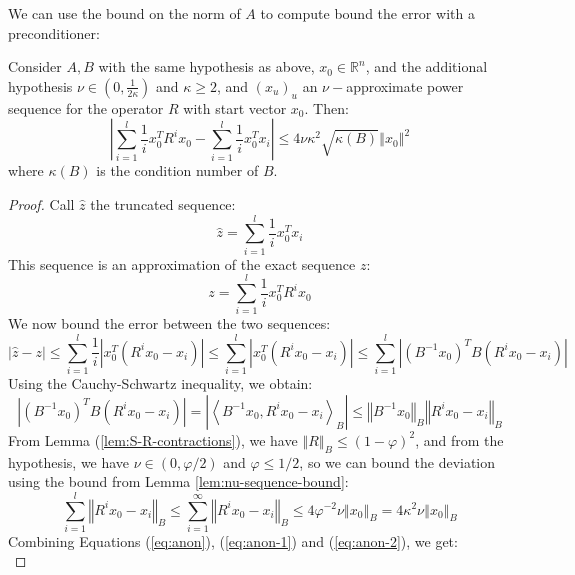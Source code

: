 We can use the bound on the norm of $A$ to compute bound the error
with a preconditioner: 
\begin{lemma}
\label{lem:partial-sequence-approximate}Consider $A,B$ with the
same hypothesis as above, $x_{0}\in\mathbb{R}^{n}$, and the additional
hypothesis $\nu\in\left(0,\frac{1}{2\kappa}\right)$ and $\kappa\ge2$,
and $\left(x_{u}\right)_{u}$ an $\nu-$approximate power sequence
for the operator $R$ with start vector $x_{0}$. Then: 
\[
\left|\sum_{i=1}^{l}\frac{1}{i}x_{0}^{T}R^{i}x_{0}-\sum_{i=1}^{l}\frac{1}{i}x_{0}^{T}x_{i}\right|\leq4\nu\kappa^{2}\sqrt{\kappa\left(B\right)}\left\Vert x_{0}\right\Vert ^{2}
\]
where $\kappa\left(B\right)$ is the condition number of $B$.\end{lemma}
\begin{proof}
Call $\hat{z}$ the truncated sequence: 
\[
\hat{z}=\sum_{i=1}^{l}\frac{1}{i}x_{0}^{T}x_{i}
\]
This sequence is an approximation of the exact sequence $z$: 
\[
z=\sum_{i=1}^{l}\frac{1}{i}x_{0}^{T}R^{i}x_{0}
\]
We now bound the error between the two sequences: 
\begin{equation}
\left|\hat{z}-z\right|\leq\sum_{i=1}^{l}\frac{1}{i}\left|x_{0}^{T}\left(R^{i}x_{0}-x_{i}\right)\right|\leq\sum_{i=1}^{l}\left|x_{0}^{T}\left(R^{i}x_{0}-x_{i}\right)\right|\leq\sum_{i=1}^{l}\left|\left(B^{-1}x_{0}\right)^{T}B\left(R^{i}x_{0}-x_{i}\right)\right|\label{eq:anon}
\end{equation}
Using the Cauchy-Schwartz inequality, we obtain: 
\begin{equation}
\left|\left(B^{-1}x_{0}\right)^{T}B\left(R^{i}x_{0}-x_{i}\right)\right|=\left|\left\langle B^{-1}x_{0},R^{i}x_{0}-x_{i}\right\rangle _{B}\right|\leq\left\Vert B^{-1}x_{0}\right\Vert _{B}\left\Vert R^{i}x_{0}-x_{i}\right\Vert _{B}\label{eq:anon-1}
\end{equation}
From Lemma (\ref{lem:S-R-contractions}), we have $\left\Vert R\right\Vert _{B}\leq\left(1-\varphi\right)^{2}$,
and from the hypothesis, we have $\nu\in\left(0,\varphi/2\right)$
and $\varphi\le1/2$, so we can bound the deviation using the bound
from Lemma \ref{lem:nu-sequence-bound}: 
\begin{equation}
\sum_{i=1}^{l}\left\Vert R^{i}x_{0}-x_{i}\right\Vert _{B}\leq\sum_{i=1}^{\infty}\left\Vert R^{i}x_{0}-x_{i}\right\Vert _{B}\leq4\varphi^{-2}\nu\left\Vert x_{0}\right\Vert _{B}=4\kappa^{2}\nu\left\Vert x_{0}\right\Vert _{B}\label{eq:anon-2}
\end{equation}
Combining Equations (\ref{eq:anon}), (\ref{eq:anon-1}) and (\ref{eq:anon-2}),
we get: 
\[
\]
\end{proof}
